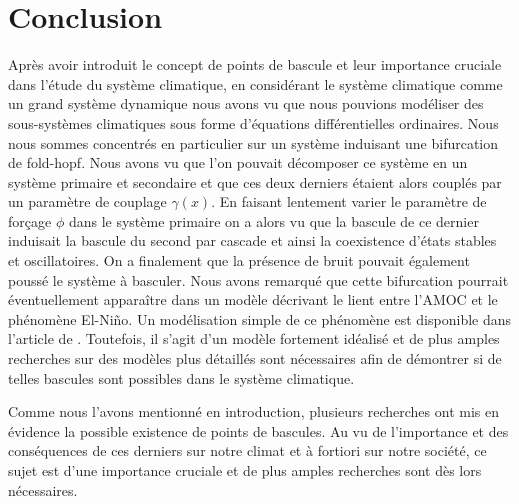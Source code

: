 \section{Conclusion}

Après avoir introduit le concept de points de bascule et leur importance cruciale dans l'étude du système climatique, en considérant le système climatique comme un grand système dynamique nous avons vu que nous pouvions modéliser des sous-systèmes climatiques sous forme d'équations différentielles ordinaires. Nous nous sommes concentrés en particulier sur un système induisant une bifurcation de fold-hopf. Nous avons vu que l'on pouvait décomposer ce système en un système primaire et secondaire et que ces deux derniers étaient alors couplés par un paramètre de couplage $\gamma(x)$. En faisant lentement varier le paramètre de forçage $\phi$ dans le système primaire on a alors vu que la bascule de ce dernier induisait la bascule du second par cascade et ainsi la coexistence d'états stables et oscillatoires. On a finalement que la présence de bruit pouvait également poussé le système à basculer. Nous avons remarqué que cette bifurcation pourrait éventuellement apparaître dans un modèle décrivant le lient entre l'AMOC et le phénomène El-Niño. Un modélisation simple de ce phénomène est disponible dans l'article de \cite{dekker_cascading_2018}. Toutefois, il s'agit d'un modèle fortement idéalisé et de plus amples recherches sur des modèles plus détaillés sont nécessaires afin de démontrer si de telles bascules sont possibles dans le système climatique.

Comme nous l'avons mentionné en introduction, plusieurs recherches ont mis en évidence la possible existence de points de bascules. Au vu de l'importance et des conséquences de ces derniers sur notre climat et à fortiori sur notre société, ce sujet est d'une importance cruciale et de plus amples recherches sont dès lors nécessaires.

